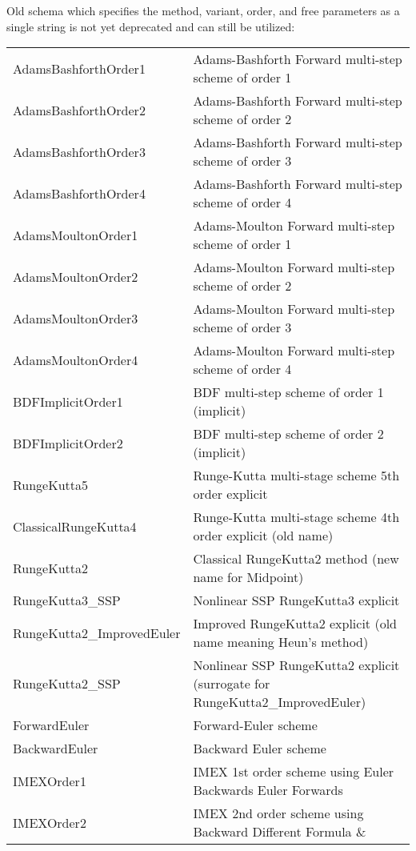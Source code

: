 Old schema which specifies the method, variant, order, and free
parameters as a single string is not yet deprecated and can still be
utilized:

\begin{center}
\footnotesize
\begin{tabular}{p{4cm}p{10cm}}
\toprule
AdamsBashforthOrder1 & Adams-Bashforth Forward multi-step scheme of order 1\\
AdamsBashforthOrder2 & Adams-Bashforth Forward multi-step scheme of order 2\\
AdamsBashforthOrder3 & Adams-Bashforth Forward multi-step scheme of order 3\\
AdamsBashforthOrder4 & Adams-Bashforth Forward multi-step scheme of order 4\\
AdamsMoultonOrder1   & Adams-Moulton Forward multi-step scheme of order 1\\
AdamsMoultonOrder2   & Adams-Moulton Forward multi-step scheme of order 2\\
AdamsMoultonOrder3   & Adams-Moulton Forward multi-step scheme of order 3\\
AdamsMoultonOrder4   & Adams-Moulton Forward multi-step scheme of order 4\\
BDFImplicitOrder1    & BDF multi-step scheme of order 1 (implicit)\\
BDFImplicitOrder2    & BDF multi-step scheme of order 2 (implicit)\\
RungeKutta5          & Runge-Kutta multi-stage scheme 5th order explicit\\
ClassicalRungeKutta4 & Runge-Kutta multi-stage scheme 4th order explicit (old name)\\
RungeKutta2          & Classical RungeKutta2 method (new name for Midpoint)\\
RungeKutta3\_SSP     & Nonlinear SSP RungeKutta3 explicit\\
RungeKutta2\_ImprovedEuler & Improved RungeKutta2 explicit (old name meaning Heun's method)\\
RungeKutta2\_SSP     & Nonlinear SSP RungeKutta2 explicit (surrogate for RungeKutta2\_ImprovedEuler)\\
ForwardEuler         & Forward-Euler scheme\\
BackwardEuler        & Backward Euler scheme\\
IMEXOrder1           & IMEX 1st order scheme using Euler Backwards Euler
                       Forwards \\
IMEXOrder2           & IMEX 2nd order scheme using Backward Different Formula \&

\end{tabular}
\end{center}
